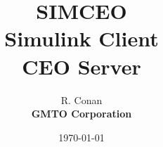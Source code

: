 \documentclass{article}
\begin{document}
\title{{\Huge \textbf{SIMCEO}}\\Simulink Client\\CEO Server}
\author{R. Conan\\\bf GMTO Corporation}
\date{\today}
\maketitle

\tableofcontents


\end{document}
